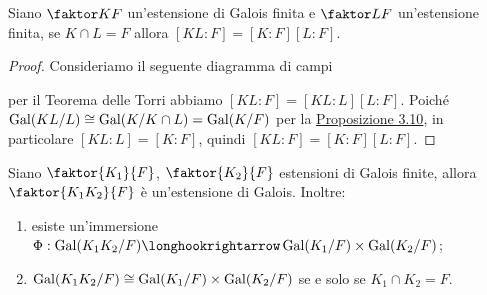 \documentclass[11pt]{scrartcl}
\begin{document}
\begin{corollary}
    Siano $\faktor K F$ un'estensione di Galois finita e $\faktor L F$ un'estensione finita, se $K\cap L = F$ allora $[KL:F] = [K:F][L:F]$.
\end{corollary}

\begin{proof}
    Consideriamo il seguente diagramma di campi
    \begin{center}
    \end{center}
    per il Teorema delle Torri abbiamo $[KL:F] = [KL:L][L:F]$. Poiché $\operatorname{Gal}(KL/L) \cong \operatorname{Gal}(K/K\cap L) = \operatorname{Gal}(K/F)$ per la 
    \hyperref[prop3.10]{Proposizione 3.10}, in particolare $[KL:L] = [K:F]$, quindi $[KL:F] = [K:F][L:F]$.
\end{proof}

\begin{proposition}
    Siano $\faktor{K_1}{F}$, $\faktor{K_2}{F}$ estensioni di Galois finite, allora $\faktor{K_1K_2}{F}$ è un'estensione di Galois. Inoltre:
    \begin{enumerate}[(1)]
        \item esiste un'immersione $\Phi: \Gal(K_1K_2/F) \longhookrightarrow \Gal(K_1/F)\times\Gal(K_2/F)$;
        \item $\operatorname{Gal}(K_1K_2/F)\cong \operatorname{Gal}(K_1/F)\times\operatorname{Gal}(K_2/F)$ se e solo se $K_1\cap K_2 = F$. 
    \end{enumerate}
\end{proposition}
\end{document}
